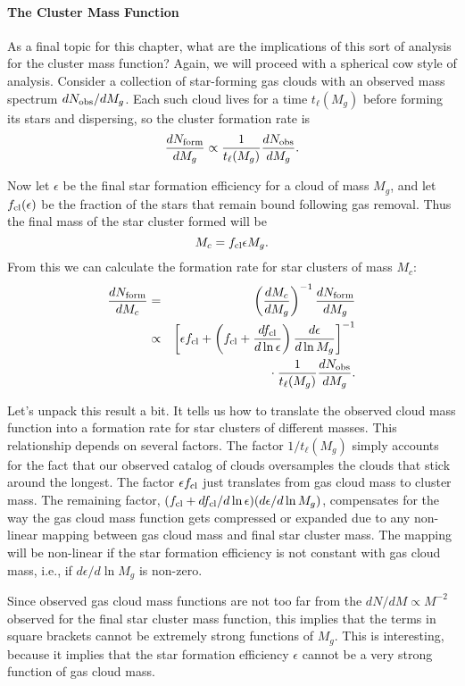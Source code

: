 \paragraph{The Cluster Mass Function}

As a final topic for this chapter, what are the implications of this sort of analysis for the cluster mass function? Again, we will proceed with a spherical cow style of analysis. Consider a collection of star-forming gas clouds with an observed mass spectrum $dN_{\rm obs}/dM_g$. Each such cloud lives for a time $t_\ell(M_g)$ before forming its stars and dispersing, so the cluster formation rate is
\begin{equation}
\frac{dN_{\rm form}}{dM_g} \propto \frac{1}{t_{\ell}(M_g)} \frac{dN_{\rm obs}}{dM_g}.
\end{equation}

Now let $\epsilon$ be the final star formation efficiency for a cloud of mass $M_g$, and let $f_{\rm cl}(\epsilon)$ be the fraction of the stars that remain bound following gas removal. Thus the final mass of the star cluster formed will be
\begin{equation}
M_c = f_{\rm cl} \epsilon M_g.
\end{equation}
From this we can calculate the formation rate for star clusters of mass $M_c$:
\begin{eqnarray}
\frac{dN_{\rm form}}{dM_c} & = & \left(\frac{dM_c}{dM_g}\right)^{-1} \frac{dN_{\rm form}}{dM_g} \\
& \propto & \left[\epsilon f_{\rm cl} + \left(f_{\rm cl}+ \frac{df_{\rm cl}}{d\ln \epsilon}\right) \frac{d\epsilon}{d\ln M_g}\right]^{-1} 
\nonumber \\
& & {} \cdot
\frac{1}{t_{\ell}(M_g)} \frac{dN_{\rm obs}}{dM_g}.
\end{eqnarray}

Let's unpack this result a bit. It tells us how to translate the observed cloud mass function into a formation rate for star clusters of different masses. This relationship depends on several factors. The factor $1/t_\ell(M_g)$ simply accounts for the fact that our observed catalog of clouds oversamples the clouds that stick around the longest. The factor $\epsilon f_{\rm cl}$ just translates from gas cloud mass to cluster mass. The remaining factor, $(f_{\rm cl} + df_{\rm cl}/d\ln\epsilon)(d\epsilon/d\ln M_g)$, compensates for the way the gas cloud mass function gets compressed or expanded due to any non-linear mapping between gas cloud mass and final star cluster mass. The mapping will be non-linear if the star formation efficiency is not constant with gas cloud mass, i.e., if $d\epsilon/d\ln M_g$ is non-zero.

Since observed gas cloud mass functions are not too far from the $dN/dM \propto M^{-2}$ observed for the final star cluster mass function, this implies that the terms in square brackets cannot be extremely strong functions of $M_g$. This is interesting, because it implies that the star formation efficiency $\epsilon$ cannot be a very strong function of gas cloud mass.
